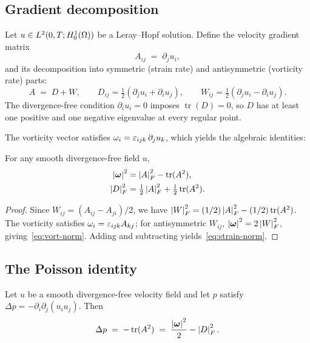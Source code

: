 \subsection{Gradient decomposition}

Let $u \in L^{2}(0,T;H^{1}_0(\Omega))$ be a Leray--Hopf solution.
Define the velocity gradient matrix
\[
  A_{ij} \;=\; \partial_j u_i,
\]
and its decomposition into symmetric (strain rate) and antisymmetric (vorticity rate) parts:
\[
  A \;=\; D + W, \qquad
  D_{ij} = \tfrac{1}{2}(\partial_j u_i + \partial_i u_j), \qquad
  W_{ij} = \tfrac{1}{2}(\partial_j u_i - \partial_i u_j).
\]
The divergence-free condition $\partial_i u_i = 0$ imposes $\operatorname{tr}(D) = 0$,
so $D$ has at least one positive and one negative eigenvalue at every regular point.

The vorticity vector satisfies $\omega_i = \varepsilon_{ijk}\,\partial_j u_k$,
which yields the algebraic identities:

\begin{lemma}\label{lem:gradient-norms}
  For any smooth divergence-free field $u$,
  \begin{align}
    \left\lvert \boldsymbol{\omega} \right\rvert^2    &= \left\lvert A \right\rvert^2_F - \operatorname{tr}(A^2), \label{eq:vort-norm}\\
    \left\lvert D \right\rvert^2_F      &= \tfrac{1}{2}\left\lvert A \right\rvert^2_F + \tfrac{1}{2}\operatorname{tr}(A^2).
                       \label{eq:strain-norm}
  \end{align}
\end{lemma}

\begin{proof}
  Since $W_{ij} = (A_{ij} - A_{ji})/2$, we have
  $\left\lvert W \right\rvert^2_F = (1/2)\left\lvert A \right\rvert^2_F - (1/2)\operatorname{tr}(A^2)$.
  The vorticity satisfies $\omega_i = \varepsilon_{ijk}A_{kj}$;
  for antisymmetric $W_{ij}$, $\left\lvert \boldsymbol{\omega} \right\rvert^2 = 2\left\lvert W \right\rvert^2_F$,
  giving~\eqref{eq:vort-norm}.  Adding and subtracting yields~\eqref{eq:strain-norm}.
\end{proof}

\subsection{The Poisson identity}

\begin{theorem}\label{thm:pressure-poisson}
  Let $u$ be a smooth divergence-free velocity field and let $p$ satisfy
  $\Delta p = -\partial_i\partial_j(u_i u_j)$.  Then
  \begin{equation}\label{eq:pressure-poisson-id}
    \Delta p \;=\; -\operatorname{tr}(A^2)
             \;=\; \frac{\left\lvert \boldsymbol{\omega} \right\rvert^2}{2} - \left\lvert D \right\rvert^2_F.
  \end{equation}
\end{theorem}

